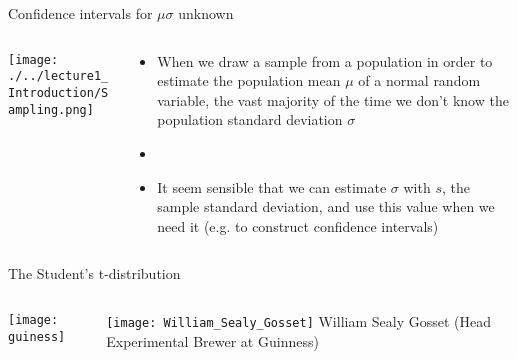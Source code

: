 \documentclass[xcolor=dvipsnames]{beamer}
\begin{document}
\begin{frame}{Confidence intervals for $\mu$}{$\sigma$ unknown}
\begin{columns}
	\begin{column}{.4 \textwidth}
		\begin{center}
			\texttt{[image: ./../lecture1\_Introduction/Sampling.png]}
		\end{center}
	\end{column}
	\begin{column}{.5 \textwidth}
		\begin{itemize}
			\item When we draw a sample from a population in order to estimate the population mean $\mu$ of a normal random variable, the vast majority of the time we don't know the population standard deviation $\sigma$
			\item[]
			\item It seem sensible that we can estimate $\sigma$ with $s$, the sample standard deviation, and use this value when we need it (e.g. to construct confidence intervals)
		\end{itemize}
	\end{column}
\end{columns}
\end{frame}

\begin{frame}{The Student's t-distribution}
	\begin{columns}
		\begin{column}{.5 \textwidth}
			\texttt{[image: guiness]}
		\end{column}
		\begin{column}{.5 \textwidth}
			\texttt{[image: William\_Sealy\_Gosset]}
			William Sealy Gosset (Head Experimental Brewer at Guinness)
		\end{column}
	\end{columns}
\end{frame}
\end{document}
